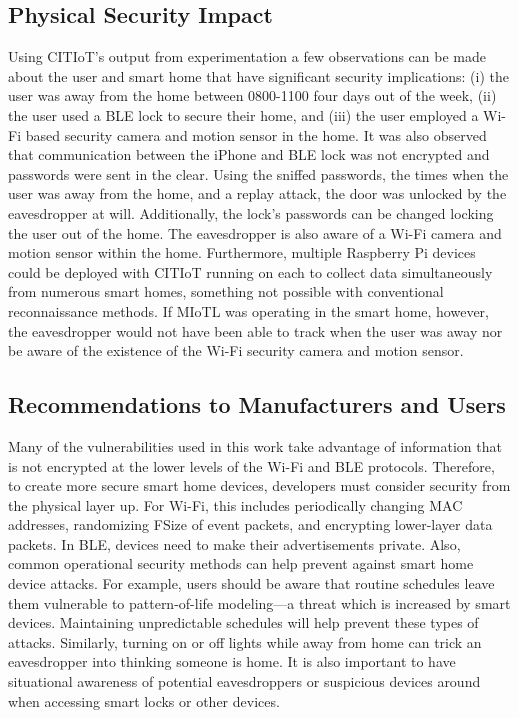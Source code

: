 \documentclass[journal]{./IEEEtran/IEEEtran}
\begin{document}
\subsection{Physical Security Impact}

Using \ac{CITIoT}'s output from experimentation a few observations can be made about the user and smart home that have significant security implications: (i) the user was away from the home between 0800-1100 four days out of the week, (ii) the user used a \ac{BLE} lock to secure their home, and (iii) the user employed a Wi-Fi based security camera and motion sensor in the home. It was also observed that communication between the iPhone and \ac{BLE} lock was not encrypted and passwords were sent in the clear. Using the sniffed passwords, the times when the user was away from the home, and a replay attack, the door was unlocked by the eavesdropper at will. Additionally, the lock's passwords can be changed locking the user out of the home. The eavesdropper is also aware of a Wi-Fi camera and motion sensor within the home. Furthermore, multiple Raspberry Pi devices could be deployed with \ac{CITIoT} running on each to collect data simultaneously from numerous smart homes, something not possible with conventional reconnaissance methods. If \ac{MIoTL} was operating in the smart home, however, the eavesdropper would not have been able to track when the user was away nor be aware of the existence of the Wi-Fi security camera and motion sensor. 

\subsection{Recommendations to Manufacturers and Users}
Many of the vulnerabilities used in this work take advantage of information that is not encrypted at the lower levels of the Wi-Fi and \ac{BLE} protocols. Therefore, to create more secure smart home devices, developers must consider security from the physical layer up. For Wi-Fi, this includes periodically changing \ac{MAC} addresses, randomizing \ac{FSize} of event packets, and encrypting lower-layer data packets. In \ac{BLE}, devices need to make their advertisements private. Also, common operational security methods can help prevent against smart home device attacks. For example, users should be aware that routine schedules leave them vulnerable to pattern-of-life modeling---a threat which is increased by smart devices. Maintaining unpredictable schedules will help prevent these types of attacks. Similarly, turning on or off lights while away from home can trick an eavesdropper into thinking someone is home. It is also important to have situational awareness of potential eavesdroppers or suspicious devices around when accessing smart locks or other devices.
\end{document}

